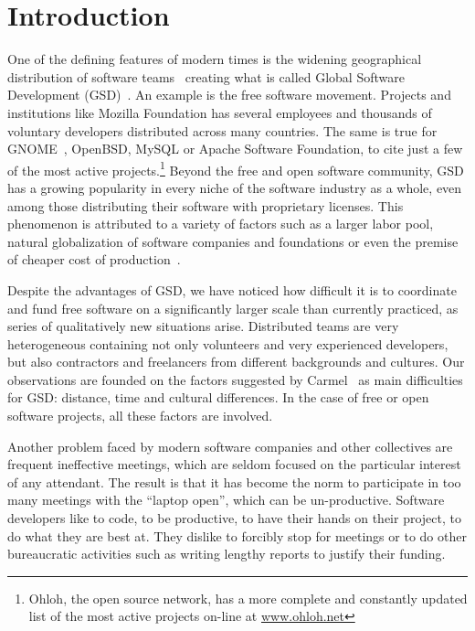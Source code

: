 \documentclass{article}
\newcommand{\indraftnote}[1]{}
\newcommand{\todo}[1]{\indraftnote{todo: #1}}
\begin{document}


\section{Introduction}

One of the defining features of modern times is the widening geographical
distribution of software teams~\cite{last2003} creating what is called Global
Software Development (GSD)~\cite{german2003,Fryer,Begel}.  
An example is the free software movement. Projects and institutions like Mozilla
Foundation has several employees and thousands of voluntary developers
distributed across many countries. The same is true for GNOME~\cite{german2003},
OpenBSD, MySQL or Apache Software Foundation, to cite just a 
few of the most active projects.\footnote{Ohloh, the open source network, has a more complete
and constantly updated list of the most active projects on-line at
\url{www.ohloh.net}} Beyond the free and open software community, GSD has a growing
popularity in every niche of the software industry as a whole, even among those
distributing their software with proprietary licenses. This phenomenon is
attributed to a variety of factors such as a larger labor pool, natural
globalization of software companies and foundations or even the premise of
cheaper cost of production~\cite{komi2005}.

Despite the advantages of GSD, we have noticed how
difficult it is to coordinate and fund free software on a significantly larger scale
than currently practiced, as series of qualitatively new situations arise. Distributed
teams are very heterogeneous containing not only volunteers and very experienced
developers, but also contractors and freelancers from different backgrounds and
cultures. Our observations are founded on the factors suggested by
Carmel~\cite{carmel1999} as main difficulties for GSD: distance, time and
cultural differences. In the case of free or open software projects, all these
factors are involved.

Another problem faced by modern software companies and other
collectives are frequent ineffective meetings, which are seldom
focused on the particular interest of any attendant. The result is that it has
become the norm to participate in too many meetings with the ``laptop
open'', which can be un-productive. Software developers
like to code, to be productive, to have their hands on their project,
to do what they are best at. They dislike to forcibly stop for meetings
or to do other bureaucratic activities such as writing lengthy reports to
justify their funding.\cite{Thompson:Wired:2012}
\end{document}
